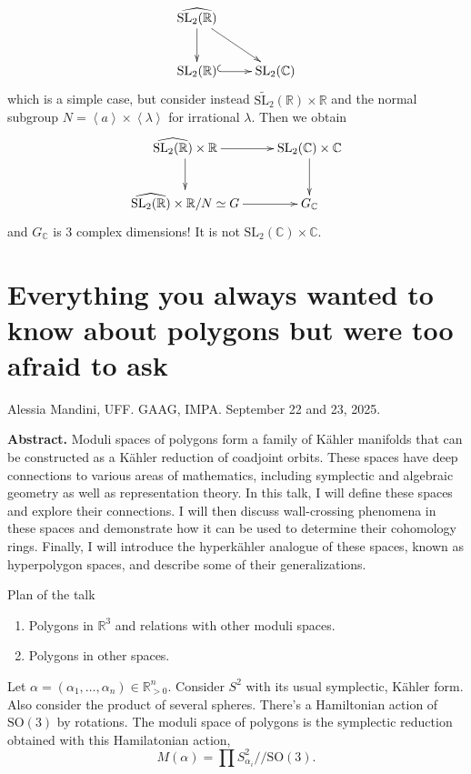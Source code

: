 \begin{example}
\label{example-complexification-groupoid}
$$
\xymatrix{
\widehat{\text{SL}_2(\mathbb{R})}\ar[d]\ar[dr]\\
\text{SL}_2(\mathbb{R})\ar@{^{(}->}[r]&\text{SL}_2(\mathbb{C})
}
$$
which is a simple case,
but consider instead $\tilde{\text{SL}_2}(\mathbb{R})\times \mathbb{R}$ 
and the normal subgroup $N=\left<a\right>\times \left<\lambda\right>$ 
for irrational $\lambda$. 
Then we obtain
$$
\xymatrix{
\widehat{\text{SL}_2(\mathbb{R})}\times\mathbb{R}\ar[r]\ar[d]
&\text{SL}_2(\mathbb{C})\times\mathbb{C}\ar[d]\\
\widehat{\text{SL}_2(\mathbb{R})}\times\mathbb{R}/N\simeq G\ar[r]&
G_\mathbb{C}
}
$$
and $G_\mathbb{C}$ is 3 complex dimensions! It is not
$\text{SL}_2(\mathbb{C})\times\mathbb{C}$.
\end{example}

\section{Everything you always wanted to know about polygons but were too
afraid to ask}
\label{section-everything-you-awlways-wanted-to-know}

\noindent
Alessia Mandini, UFF.
GAAG, IMPA. 
September 22 and 23, 2025.

\medskip
{\bf Abstract.} Moduli spaces of polygons form a family of Kähler
manifolds that can be constructed as a Kähler reduction of coadjoint orbits.
These spaces have deep connections to various areas of mathematics, including
symplectic and algebraic geometry as well as representation theory. In this
talk, I will define these spaces and explore their connections. I will then
discuss wall-crossing phenomena in these spaces and demonstrate how it can be
used to determine their cohomology rings. Finally, I will introduce the
hyperkähler analogue of these spaces, known as hyperpolygon spaces, and describe
some of their generalizations.

\medskip\noindent



Plan of the talk
\begin{enumerate}
\item Polygons in $\mathbb{R}^3$ and relations with
other moduli spaces.
\item Polygons in other spaces.
\end{enumerate}

Let $\alpha=(\alpha_1,\ldots,\alpha_n)\in \mathbb{R}^n_{>0}$.
Consider $S^2$ with its usual symplectic, Kähler form.
Also consider the product of several spheres.
There's a Hamiltonian action of $\text{SO}(3)$ by rotations.
The moduli space of polygons is
the symplectic reduction obtained with this
Hamilatonian action,
$$
M(\alpha)=\prod S^2_{\alpha_i}/\!/\text{SO}(3).
$$

